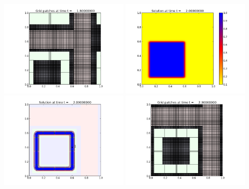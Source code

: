 \documentclass[11pt]{article}
\begin{document}
\vskip 10pt 
\includegraphics[width=0.475\textwidth]{frame0009fig2.png}
\vskip 10pt 
\includegraphics[width=0.475\textwidth]{frame0010fig0.png}
\includegraphics[width=0.475\textwidth]{frame0010fig1.png}
\vskip 10pt 
\includegraphics[width=0.475\textwidth]{frame0010fig2.png}
\end{document}
